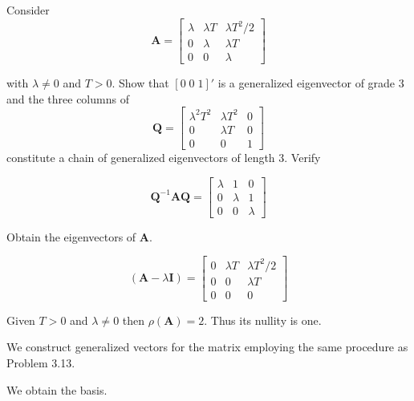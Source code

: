 \item[3.17] Consider
\begin{equation*}
 \mathbf{A} = \begin{bmatrix}
      \lambda & \lambda T & \lambda T^2 / 2 \\
      0 &\lambda & \lambda T \\
      0 & 0 & \lambda
     \end{bmatrix}
\end{equation*}

with $\lambda \neq 0$ and $T > 0$.
Show that $[0 \; 0 \; 1]'$ is a generalized eigenvector of grade 3 and the three columns of
\begin{equation*}
 \mathbf{Q} = \begin{bmatrix}
      \lambda^2 T^2 & \lambda T^2 & 0\\
      0 & \lambda T & 0\\
      0 & 0 & 1
     \end{bmatrix}
\end{equation*}
 constitute a chain of generalized eigenvectors of length 3.
 Verify

 \begin{equation*}
  \mathbf{Q}^{-1} \mathbf{A} \mathbf{Q} = \begin{bmatrix}
                \lambda & 1 & 0\\
                0 & \lambda & 1\\
                0 & 0 & \lambda
               \end{bmatrix}
 \end{equation*}

 Obtain the eigenvectors of $\mathbf{A}$.

 \begin{equation*}
  (\mathbf{A} - \lambda \mathbf{I})
  = \begin{bmatrix}
        0 & \lambda T & \lambda T^2 / 2 \\
        0 & 0 & \lambda T \\
        0 & 0 & 0
    \end{bmatrix}
 \end{equation*}

Given $T > 0$ and $\lambda \neq 0$ then $\rho (\mathbf{A}) = 2$.
Thus its nullity is one.

We construct generalized vectors for the matrix
employing the same procedure as Problem 3.13.

We obtain the basis.

